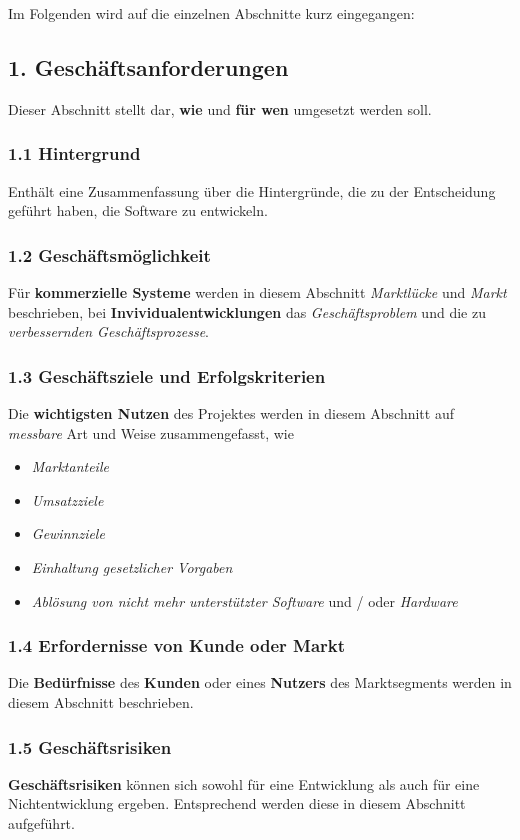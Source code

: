 \noindent
Im Folgenden wird auf die einzelnen Abschnitte kurz eingegangen:

\subsection*{1. Geschäftsanforderungen}
Dieser Abschnitt stellt dar, \textbf{wie} und \textbf{für wen} umgesetzt werden soll.

\subsubsection*{1.1 Hintergrund}
Enthält eine Zusammenfassung über die Hintergründe, die zu der Entscheidung geführt haben, die Software zu entwickeln.

\subsubsection*{1.2 Geschäftsmöglichkeit}
Für \textbf{kommerzielle Systeme} werden in diesem Abschnitt \textit{Marktlücke} und \textit{Markt} beschrieben, bei \textbf{Invividualentwicklungen} das \textit{Geschäftsproblem} und die zu \textit{verbessernden Geschäftsprozesse}.

\subsubsection*{1.3 Geschäftsziele und Erfolgskriterien}
Die \textbf{wichtigsten Nutzen} des Projektes werden in diesem Abschnitt auf \textit{messbare} Art und Weise zusammengefasst, wie
\begin{itemize}
    \item \textit{Marktanteile}
    \item \textit{Umsatzziele}
    \item \textit{Gewinnziele}
    \item \textit{Einhaltung gesetzlicher Vorgaben}
    \item \textit{Ablösung von nicht mehr unterstützter Software} und / oder \textit{Hardware}
\end{itemize}

\subsubsection*{1.4 Erfordernisse von Kunde oder Markt}
Die \textbf{Bedürfnisse} des \textbf{Kunden} oder eines \textbf{Nutzers} des Marktsegments werden in diesem Abschnitt beschrieben.

\subsubsection*{1.5 Geschäftsrisiken}
\textbf{Geschäftsrisiken} können sich sowohl für eine Entwicklung als auch für eine Nichtentwicklung ergeben.
Entsprechend werden diese in diesem Abschnitt aufgeführt.

